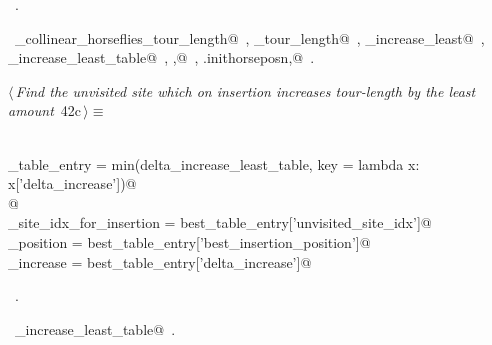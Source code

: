 \documentclass[11.5pt]{report}
\begin{document}
\begin{flushleft}
\begin{list}{}{}
\mbox{}\verb@                                   'best_insertion_position' : ibest, \@\\
\mbox{}\verb@                                   'delta_increase'          : delta_increase_least})@\\
\mbox{}\verb@@{\NWsep}
\end{list}
\vspace{-1.5ex}
\footnotesize
\begin{list}{}{\setlength{\itemsep}{-\parsep}\setlength{\itemindent}{-\leftmargin}}
\item \NWtxtMacroRefIn\ .
\item \NWtxtIdentsUsed\nobreak\  \verb@compute_collinear_horseflies_tour_length@\nobreak\ , \verb@current_tour_length@\nobreak\ , \verb@delta_increase_least@\nobreak\ , \verb@delta_increase_least_table@\nobreak\ , \verb@ibest,@\nobreak\ , \verb@self.inithorseposn,@\nobreak\ .
\item{}
\end{list}
\vspace{4ex}
\end{flushleft}
\vspace{-0.8cm}\newchunk 
\begin{flushleft} \small\label{scrap50}\raggedright\small
{} $\langle\,${\itshape Find the unvisited site which on insertion increases tour-length by the least amount}\nobreak\ {\footnotesize {42c}}$\,\rangle\equiv$
\vspace{-1ex}
\begin{list}{}{} \item
\mbox{}\verb@@\\
\mbox{}\verb@best_table_entry = min(delta_increase_least_table, key = lambda x: x['delta_increase'])@\\
\mbox{}\verb@         @\\
\mbox{}\verb@unvisited_site_idx_for_insertion = best_table_entry['unvisited_site_idx']@\\
\mbox{}\verb@insertion_position               = best_table_entry['best_insertion_position']@\\
\mbox{}\verb@delta_increase                   = best_table_entry['delta_increase']@\\
\mbox{}\verb@@{\NWsep}
\end{list}
\vspace{-1.5ex}
\footnotesize
\begin{list}{}{\setlength{\itemsep}{-\parsep}\setlength{\itemindent}{-\leftmargin}}
\item \NWtxtMacroRefIn\ .
\item \NWtxtIdentsUsed\nobreak\  \verb@delta_increase_least_table@\nobreak\ .
\item{}
\end{list}
\vspace{4ex}
\end{flushleft}
\end{document}
